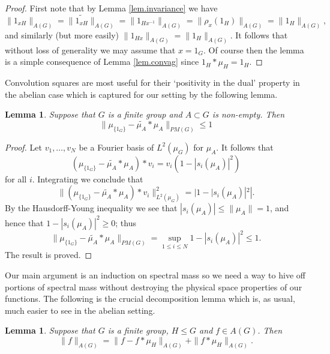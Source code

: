\documentclass[12pt]{amsart}
\numberwithin{equation}{section}
\theoremstyle{plain}
\newtheorem{lemma}[subsection]{Lemma}
\theoremstyle{definition}
\renewcommand{\leq}{\leqslant}
\renewcommand{\geq}{\geqslant}
\begin{document}
\begin{proof}
First note that by Lemma \ref{lem.invariance} we have
\begin{equation*}
\|1_{xH}\|_{A(G)} = \|\widetilde{1_{xH}}\|_{A(G)} = \|1_{Hx^{-1}}\|_{A(G)} = \|\rho_x(1_H)\|_{A(G)} = \|1_H\|_{A(G)},
\end{equation*}
and similarly (but more easily) $\|1_{Hx}\|_{A(G)} = \|1_H\|_{A(G)}$.  It follows that without loss of generality we may assume that $x=1_G$.  Of course then the lemma is a simple consequence of Lemma \ref{lem.convag} since $1_H \ast \mu_H = 1_H$.
\end{proof}
Convolution squares are most useful for their `positivity in the dual' property in the abelian case which is captured for our setting by the following lemma.
 \begin{lemma}\label{lem.bohrfourier}
 Suppose that $G$ is a finite group and $A \subset G$ is non-empty. Then
 \begin{equation*}
 \|\mu_{\{1_G\}} - \widetilde{\mu_A} \ast \mu_{A}\|_{PM(G)} \leq 1
 \end{equation*}
 \end{lemma}
 \begin{proof}
 Let $v_1,\dots,v_N$ be a Fourier basis of $L^2(\mu_G)$ for $\mu_A$.  It follows that
 \begin{equation*}
 (\mu_{\{1_G\}} - \widetilde{\mu_A} \ast \mu_{A}) \ast v_i = v_i(1-|s_i(\mu_A)|^2)
 \end{equation*}
 for all $i$.  Integrating we conclude that
  \begin{equation*}
 \| (\mu_{\{1_G\}} - \widetilde{\mu_A} \ast \mu_{A}) \ast v_i \|_{L^2(\mu_G)}^2 = |1-|s_i(\mu_A)|^2|.
 \end{equation*}
 By the Hausdorff-Young inequality we see that $|s_i(\mu_A)|\leq \|\mu_A\| = 1$, and hence that $1-|s_i(\mu_A)|^2 \geq 0$; thus
 \begin{equation*}
 \|\mu_{\{1_G\}} - \widetilde{\mu_A} \ast \mu_{A}\|_{PM(G)} = \sup_{1 \leq i \leq N}{1-|s_i(\mu_A)|^2} \leq 1.
 \end{equation*}
The result is proved.
 \end{proof}
 Our main argument is an induction on spectral mass so we need a way to hive off portions of spectral mass without destroying the physical space properties of our functions.  The following is the crucial decomposition lemma which is, as usual, much easier to see in the abelian setting.
 \begin{lemma}\label{lem.decompmass}
Suppose that $G$ is a finite group, $H \leq G$ and $f \in A(G)$.  Then
\begin{equation*}
\|f\|_{A(G)} = \|f-f\ast \mu_H\|_{A(G)} + \|f \ast \mu_H\|_{A(G)}.
\end{equation*}
\end{lemma}
\end{document}
